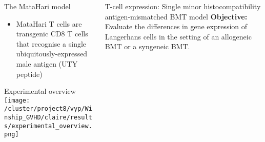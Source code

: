 \documentclass[final,hyperref={pdfpagelabels=false}]{beamer}
\begin{document}
\begin{frame}{}
\begin{columns}[t]
\begin{column}{.20\linewidth}
	\begin{block}{The MataHari model}  %
 {\small	\begin{itemize}
	\item MataHari T cells are transgenic CD8 T cells that recognise a single ubiquitously-expressed male antigen (UTY peptide)
	\end{itemize}}
	\end{block}

	\begin{block}{Experimental overview}
	\texttt{[image: /cluster/project8/vyp/Winship\_GVHD/claire/results/experimental\_overview.png]}
	\end{block}
      \end{column}

      \begin{column}{.40\linewidth}


        \begin{block}{T-cell expression: Single minor histocompatibility antigen-mismatched BMT model}
	  {\bf Objective:} Evaluate the differences in gene expression of Langerhans cells in the setting of an allogeneic BMT or a syngeneic BMT. 


%



\end{block}
\end{column}
\end{columns}
\end{frame}
\end{document}
